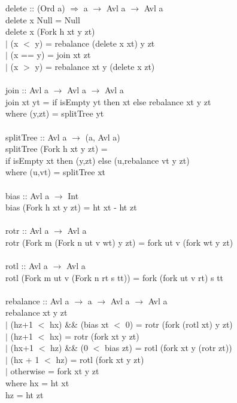 \documentclass[11pt]{article}
\begin{document}
\begin{smallprogram*}
\>  delete :: (Ord a) $\Rightarrow$ a $\rightarrow$ Avl a $\rightarrow$ Avl a \\
\>  delete x Null = Null \\
\>  delete x (Fork h xt y zt)  \\
\>    $\mid$ (x $<$ y) = rebalance (delete x xt) y zt \\
\>    $\mid$ (x == y) = join xt zt \\
\>    $\mid$ (x $>$ y) = rebalance xt y (delete x zt) \\
\> \\
\>  join :: Avl a $\rightarrow$ Avl a $\rightarrow$ Avl a \\
\>  join xt yt = if isEmpty yt then xt else rebalance xt y zt \\
\>                   where (y,zt) = splitTree yt \\
\> \\
\>  splitTree :: Avl a $\rightarrow$ (a, Avl a) \\
\>  splitTree (Fork h xt y zt) = \\
\>      if isEmpty xt then (y,zt) else (u,rebalance vt y zt) \\
\>         where (u,vt) = splitTree xt \\
\> \\
\>  bias :: Avl a $\rightarrow$ Int \\
\>  bias (Fork h xt y zt) = ht xt - ht zt \\
\> \\
\>  rotr :: Avl a $\rightarrow$ Avl a \\
\>  rotr (Fork m (Fork n ut v wt) y zt) = fork ut v (fork wt y zt) \\
\> \\
\>  rotl :: Avl a $\rightarrow$ Avl a \\
\>  rotl (Fork m ut v (Fork n rt s tt)) = fork (fork ut v rt) s tt \\
\> \\
\>  rebalance :: Avl a $\rightarrow$ a $\rightarrow$ Avl a $\rightarrow$ Avl a \\
\>  rebalance xt y zt  \\
\>    $\mid$ (hz+1 $<$ hx) \&\& (bias xt $<$ 0) = rotr (fork (rotl xt) y zt) \\
\>    $\mid$ (hz+1 $<$ hx)                       = rotr (fork xt y zt) \\
\>    $\mid$ (hx+1 $<$ hz) \&\& (0 $<$ bias zt) = rotl (fork xt y (rotr zt)) \\
\>    $\mid$ (hx + 1 $<$ hz)                     = rotl (fork xt y zt) \\
\>    $\mid$ otherwise                           = fork xt y zt \\
\>        where hx = ht xt \\
\>                hz = ht zt \\
\end{smallprogram*}
\end{document}
